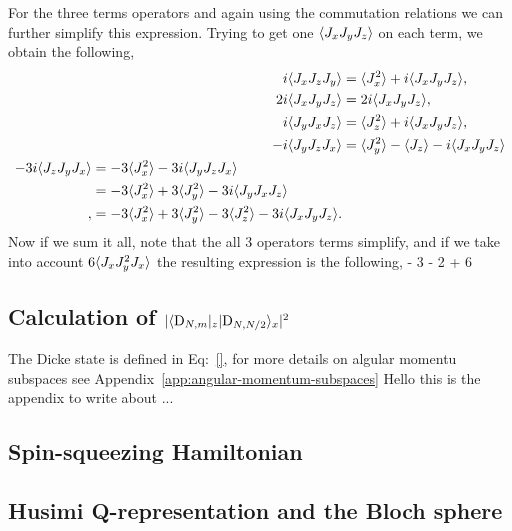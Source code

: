 For the three terms operators and again using the commutation relations we can further simplify this expression. Trying to get one $\langle J_xJ_yJ_z \rangle$ on each term, we obtain the following,
\begin{subequations}
\begin{align}
  i\langle J_xJ_zJ_y \rangle & = \langle J_x^2 \rangle+i\langle J_xJ_yJ_z \rangle,
  \label{eq:ap-last-terms-1} \\
  2i\langle J_xJ_yJ_z \rangle & = 2i\langle J_xJ_yJ_z \rangle,
  \label{eq:ap-last-term-2} \\
  i\langle J_yJ_xJ_z \rangle & = \langle J_z^2 \rangle+i\langle J_xJ_yJ_z \rangle,
  \label{eq:ap-simplification-3} \\
  -i\langle J_yJ_zJ_x \rangle & = \langle J_y^2 \rangle - \langle J_z \rangle - i\langle J_xJ_yJ_z \rangle \\
\begin{split}
  -3i\langle J_zJ_yJ_x \rangle & = -3\langle J_x^2 \rangle - 3i \langle J_yJ_zJ_x \rangle \\
  & = -3\langle J_x^2 \rangle + 3 \langle J_y^2 \rangle - 3i\langle J_yJ_xJ_z \rangle \\,
  & = -3\langle J_x^2 \rangle + 3 \langle J_y^2 \rangle - 3\langle J_z^2 \rangle
   - 3i \langle J_xJ_yJ_z \rangle.
  \label{eq:ap-simplification-4}
\end{split}
\end{align}
\end{subequations}
Now if we sum it all, note that the all 3 operators terms simplify, and if we take into account $6\langle J_xJ_y^2J_x \rangle$ the resulting expression is the following,
 - 3  - 2 + 6
\ee

\subsection{Calculation of $|\langle \textnormal{D}_{N,m} \vert_z\vert \textnormal{D}_{N,N/2} \rangle_x|^2$}
\label{app:calculation-dicke-overlap}

The Dicke state is defined in Eq:~\eqref{}, for more details on algular momentu subspaces see Appendix~\ref{app:angular-momentum-subspaces}
Hello this is the appendix to write about ...

\subsection{Spin-squeezing Hamiltonian}
\label{app:spin-squeezing-hamiltonian}

\subsection{Husimi Q-representation and the Bloch sphere}
\label{app:husimi-representation}


